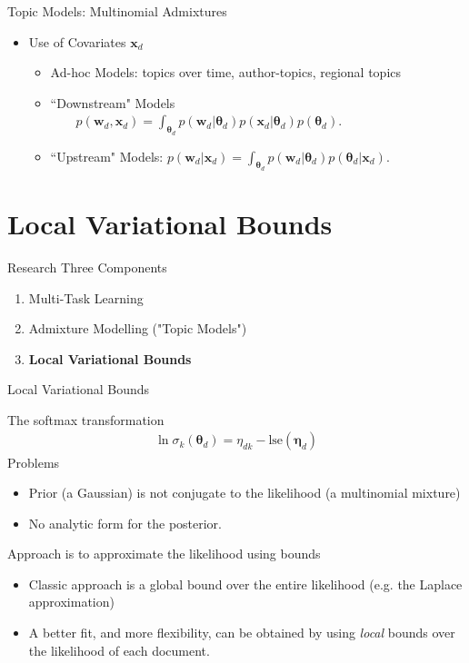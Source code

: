 \documentclass[xcolor=dvipsnames]{beamer}
\newcommand \vv[1] { \boldsymbol #1 }
\newcommand \wdoc      { { \vv{w}_d } }
\newcommand \thd[0]  { { \vv \theta_d } }
\newcommand \xd      { { \vv x_d } }
\newcommand \lse { \text{lse} }
\begin{document}
\begin{frame}{Topic Models: Multinomial Admixtures}
\begin{itemize}
    \item<5-> Use of Covariates $\vv{x}_d$
     { \begin{itemize}
        \item Ad-hoc Models: topics over time\cite{Wang2006}, author-topics\cite{MacCallum2007}, regional topics\cite{Eisenstein2010}
        \item ``Downstream" Models\cite{Blei2003}\cite{Salomatin2009}\cite{Virtanen2012a} \\$\qquad p(\wdoc,\xd) = \int_{\thd} p(\wdoc|\thd) p(\xd|\thd) p(\thd)$.
        \item ``Upstream" Models:\cite{Mimno2008} $p(\wdoc | \xd) = \int_{\thd} p(\wdoc|\thd) p(\thd|\xd)$.
    \end{itemize} 
    }
    
\end{itemize}


\end{frame}

\section{Local Variational Bounds}

\begin{frame}{Research}
Three Components


    \begin{enumerate}
        \item { \color{gray} Multi-Task Learning }
        \item { \color{gray} Admixture Modelling ("Topic Models")}
        \item { \bf Local Variational Bounds}
    \end{enumerate}


\end{frame}




\begin{frame}{Local Variational Bounds}

The softmax transformation
\begin{align}
    \ln \sigma_k\left(\thd\right) = \eta_{dk} - \lse(\vv{\eta}_d)
\end{align}
Problems
\begin{itemize}
    \item Prior (a Gaussian) is not conjugate to the likelihood (a multinomial mixture)
    \item No analytic form for the posterior.
\end{itemize}
Approach is to approximate the likelihood using bounds
\begin{itemize}
    \item Classic approach is a global bound over the entire likelihood (e.g. the Laplace approximation)
    \item A better fit, and more flexibility, can be obtained by using \emph{local} bounds over the likelihood of each document.
\end{itemize}

\end{frame}
\end{document}
